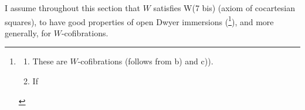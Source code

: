 {\reversemarginpar\marginnote{\textbar\textbar\textbar}}I assume throughout this section that $W$ satisfies W(7 bis) (axiom of cocartesian squares), to have good properties of open Dwyer immersions (\footnote[124]{\begin{enumerate}
\item[a)] These are $W$-cofibrations (follows from b) and c)).
\item[b)] If
\end{enumerate}}), and more generally, for $W$-cofibrations. %

